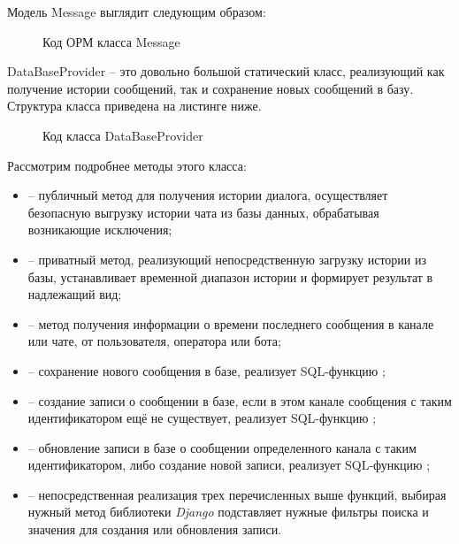     \newpage
    Модель Message выглядит следующим образом:

    \begin{figure}[H]
        \centering
        
        \caption{Код ОРМ класса Message}
        \label{fig:message_model}
    \end{figure}

    DataBaseProvider -- это довольно большой статический класс, реализующий как получение истории сообщений,
    так и сохранение новых сообщений в базу.
    Структура класса приведена на листинге ниже.

    \begin{figure}[H]
        \centering
        
        \caption{Код класса DataBaseProvider}
        \label{fig:DataBaseProvider}
    \end{figure}

    Рассмотрим подробнее методы этого класса:
    \begin{itemize}
        \item {} -- публичный метод для получения истории диалога, осуществляет
        безопасную выгрузку истории чата из базы данных, обрабатывая возникающие исключения;
        \item {} -- приватный метод, реализующий непосредственную загрузку истории из базы,
        устанавливает временной диапазон истории и формирует результат в надлежащий вид;
        \item {} -- метод получения информации о времени последнего сообщения
        в канале или чате, от пользователя, оператора или бота;
        \item {} -- сохранение нового сообщения в базе, реализует SQL-функцию ;
        \item {} -- создание записи о сообщении в базе, если в этом канале сообщения с таким
        идентификатором ещё не существует, реализует SQL-функцию ;
        \item {} -- обновление записи в базе о сообщении определенного канала с таким
        идентификатором, либо создание новой записи, реализует SQL-функцию ;
        \item {} -- непосредственная реализация трех перечисленных выше функций,
        выбирая нужный метод библиотеки \textit{Django} подставляет нужные фильтры поиска и значения для создания
        или обновления записи.
    \end{itemize}

